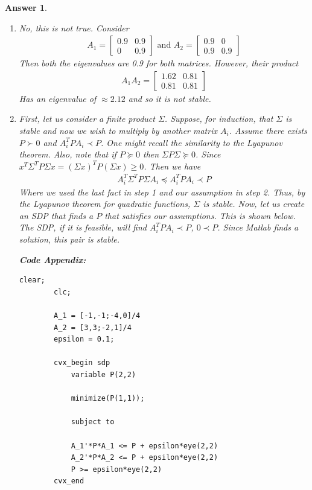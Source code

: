 \documentclass[12pt]{article}
\theoremstyle{colon}
\newtheorem*{answer}{Answer}
\begin{document}
\begin{answer}
  \begin{enumerate}[label=\arabic*)]
    \item No, this is not true. Consider
      \begin{gather*}
        A_1 = \begin{bmatrix}
          0.9 & 0.9 \\
          0 & 0.9
        \end{bmatrix} \text{ and } A_2 = \begin{bmatrix}
          0.9 & 0 \\
          0.9 & 0.9
        \end{bmatrix}
      \end{gather*}
      Then both the eigenvalues are 0.9 for both matrices. However, their product
      \begin{gather*}
        A_1 A_2 = \begin{bmatrix}
          1.62 & 0.81 \\
          0.81 & 0.81
        \end{bmatrix}
      \end{gather*}
      Has an eigenvalue of $\approx 2.12$ and so it is not stable.

    \item First, let us consider a finite product $\Sigma$. Suppose, for induction, that $\Sigma$ is stable and now we wish to multiply by another matrix $A_i$. Assume there exists $P \succ 0$ and $A_i^T P A_i \prec P$. One might recall the similarity to the Lyapunov theorem. Also, note that if $P \succeq 0$ then $\Sigma P \Sigma \succeq 0$. Since $x^T \Sigma^T P \Sigma x = (\Sigma x)^T P (\Sigma x) \geq 0$. Then we have
      \begin{gather*}
        A_i^T \Sigma^T P \Sigma A_i \preceq A_i^T P A_i \prec P
      \end{gather*}
      Where we used the last fact in step 1 and our assumption in step 2. Thus, by the Lyapunov theorem for quadratic functions, $\Sigma$ is stable. Now, let us create an SDP that finds a $P$ that satisfies our assumptions. This is shown below. The SDP, if it is feasible, will find $A_i^T P A_i \prec P$, $0 \prec P$. Since Matlab finds a solution, this pair is stable.

      \clearpage

      \textbf{Code Appendix:}

      \begin{lstlisting}[style=Matlab-editor, basicstyle=\scriptsize]
        clear;
        clc;

        A_1 = [-1,-1;-4,0]/4
        A_2 = [3,3;-2,1]/4
        epsilon = 0.1;

        cvx_begin sdp
            variable P(2,2)

            minimize(P(1,1));

            subject to

            A_1'*P*A_1 <= P + epsilon*eye(2,2)
            A_2'*P*A_2 <= P + epsilon*eye(2,2)
            P >= epsilon*eye(2,2)
        cvx_end
      \end{lstlisting}
  \end{enumerate}
\end{answer}
\end{document}
